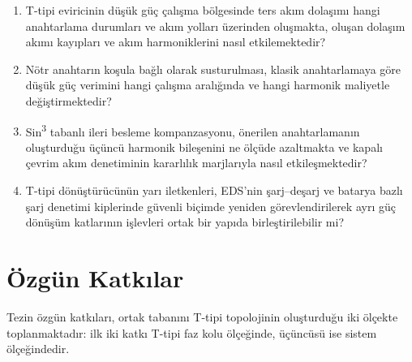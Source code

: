 \begin{enumerate}[label=AS\arabic*.]
  \item T-tipi eviricinin düşük güç çalışma bölgesinde ters akım dolaşımı hangi anahtarlama durumları ve akım yolları üzerinden oluşmakta, oluşan dolaşım akımı kayıpları ve akım harmoniklerini nasıl etkilemektedir?
  \item Nötr anahtarın koşula bağlı olarak susturulması, klasik anahtarlamaya göre düşük güç verimini hangi çalışma aralığında ve hangi harmonik maliyetle değiştirmektedir?
  \item Sin\textsuperscript{3} tabanlı ileri besleme kompanzasyonu, önerilen anahtarlamanın oluşturduğu üçüncü harmonik bileşenini ne ölçüde azaltmakta ve kapalı çevrim akım denetiminin kararlılık marjlarıyla nasıl etkileşmektedir?
  \item T-tipi dönüştürücünün yarı iletkenleri, EDS'nin şarj--deşarj ve batarya bazlı şarj denetimi kiplerinde güvenli biçimde yeniden görevlendirilerek ayrı güç dönüşüm katlarının işlevleri ortak bir yapıda birleştirilebilir mi?
\end{enumerate}

\section{Özgün Katkılar}
\label{sec:giris-katkilar}

Tezin özgün katkıları, ortak tabanını T-tipi topolojinin oluşturduğu iki ölçekte toplanmaktadır: ilk iki katkı T-tipi faz kolu ölçeğinde, üçüncüsü ise sistem ölçeğindedir.


